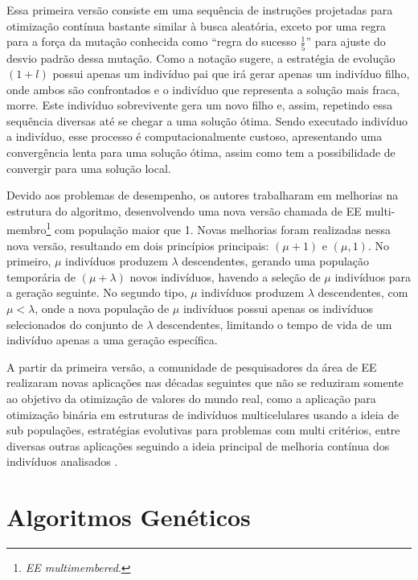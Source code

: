 Essa primeira versão consiste em uma sequência de instruções projetadas para otimização contínua bastante similar à busca aleatória, exceto por uma regra para a força da mutação conhecida como \enquote{regra do sucesso $\frac{1}{5}$} para ajuste do desvio padrão dessa mutação. Como a notação sugere, a estratégia de evolução $(1 + l)$ possui apenas um indivíduo pai que irá gerar apenas um indivíduo filho, onde ambos são confrontados e o indivíduo que representa a solução mais fraca, morre. Este indivíduo sobrevivente gera um novo filho e, assim, repetindo essa sequência diversas até se chegar a uma solução ótima. Sendo executado indivíduo a indivíduo, esse processo é computacionalmente custoso, apresentando uma convergência lenta para uma solução ótima, assim como tem a possibilidade de convergir para uma solução local.

Devido aos problemas de desempenho, os autores trabalharam em melhorias na estrutura do algoritmo, desenvolvendo uma nova versão chamada de EE multi-membro\footnote{\textit{EE multimembered}.} com população maior que 1. Novas melhorias foram realizadas nessa nova versão, resultando em dois princípios principais: $(\mu+1)$ e $(\mu, 1)$. No primeiro, $\mu$ indivíduos produzem $\lambda$ descendentes, gerando uma população temporária de $(\mu + \lambda)$ novos indivíduos, havendo a seleção de $\mu$ indivíduos para a geração seguinte. No segundo tipo, $\mu$ indivíduos produzem $\lambda$ descendentes, com $\mu < \lambda$, onde a nova população de $\mu$ indivíduos possui apenas os indivíduos selecionados do conjunto de $\lambda$ descendentes, limitando o tempo de vida de um indivíduo apenas a uma geração específica.

A partir da primeira versão, a comunidade de pesquisadores da área de EE realizaram novas aplicações nas décadas seguintes que não se reduziram somente ao objetivo da otimização de valores do mundo real, como a aplicação para otimização binária em estruturas de indivíduos multicelulares usando a ideia de sub populações, estratégias evolutivas para problemas com multi critérios, entre diversas outras aplicações seguindo a ideia principal de melhoria contínua dos indivíduos analisados .

\section{Algoritmos Genéticos} 
\label{sec:AlgoritmosGeneticos}

